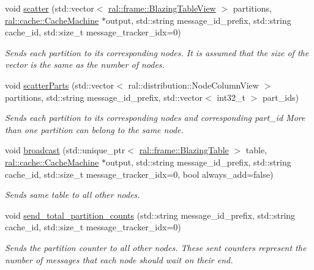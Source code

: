 \begin{DoxyCompactItemize}
void \hyperlink{classral_1_1cache_1_1distributing__kernel_ae2f86983ba3baca3a1f37ad7a6fc9326}{scatter} (std\+::vector$<$ \hyperlink{classral_1_1frame_1_1BlazingTableView}{ral\+::frame\+::\+Blazing\+Table\+View} $>$ partitions, \hyperlink{classral_1_1cache_1_1CacheMachine}{ral\+::cache\+::\+Cache\+Machine} $\ast$output, std\+::string message\+\_\+id\+\_\+prefix, std\+::string cache\+\_\+id, std\+::size\+\_\+t message\+\_\+tracker\+\_\+idx=0)
\begin{DoxyCompactList}\small\item\em Sends each partition to its corresponding nodes. It is assumed that the size of the vector is the same as the number of nodes. \end{DoxyCompactList}\item 
void \hyperlink{classral_1_1cache_1_1distributing__kernel_ac84717592ca882bcae7efd6a20ea2863}{scatter\+Parts} (std\+::vector$<$ ral\+::distribution\+::\+Node\+Column\+View $>$ partitions, std\+::string message\+\_\+id\+\_\+prefix, std\+::vector$<$ int32\+\_\+t $>$ part\+\_\+ids)
\begin{DoxyCompactList}\small\item\em Sends each partition to its corresponding nodes and corresponding part\+\_\+id More than one partition can belong to the same node. \end{DoxyCompactList}\item 
void \hyperlink{classral_1_1cache_1_1distributing__kernel_a943284f948c1f1486b04e6b02cdc3e19}{broadcast} (std\+::unique\+\_\+ptr$<$ \hyperlink{classral_1_1frame_1_1BlazingTable}{ral\+::frame\+::\+Blazing\+Table} $>$ table, \hyperlink{classral_1_1cache_1_1CacheMachine}{ral\+::cache\+::\+Cache\+Machine} $\ast$output, std\+::string message\+\_\+id\+\_\+prefix, std\+::string cache\+\_\+id, std\+::size\+\_\+t message\+\_\+tracker\+\_\+idx=0, bool always\+\_\+add=false)
\begin{DoxyCompactList}\small\item\em Sends same table to all other nodes. \end{DoxyCompactList}\item 
void \hyperlink{classral_1_1cache_1_1distributing__kernel_a532f4eb42963c4e76199f9250c483a09}{send\+\_\+total\+\_\+partition\+\_\+counts} (std\+::string message\+\_\+id\+\_\+prefix, std\+::string cache\+\_\+id, std\+::size\+\_\+t message\+\_\+tracker\+\_\+idx=0)
\begin{DoxyCompactList}\small\item\em Sends the partition counter to all other nodes. These sent counters represent the number of messages that each node should wait on their end. \end{DoxyCompactList}\item 

\end{DoxyCompactItemize}
